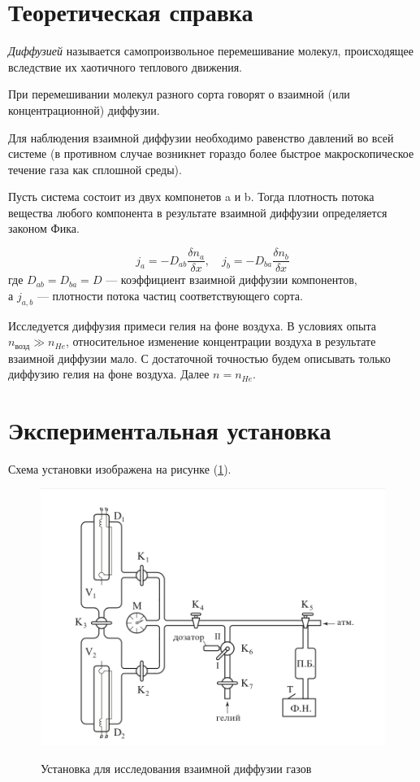 \documentclass[a4paper,12pt]{article} %
\begin{document}
\section*{Теоретическая справка}

\textit{Диффузией} называется самопроизвольное перемешивание молекул, происходящее вследствие их хаотичного теплового движения.

При перемешивании молекул разного сорта говорят о взаимной (или концентрационной) диффузии. 

Для наблюдения взаимной диффузии необходимо равенство давлений во всей системе (в противном случае возникнет гораздо более быстрое макроскопическое течение газа как сплошной среды).

\medskip

Пусть система состоит из двух компонетов a и b. 
Тогда плотность потока вещества любого компонента в результате взаимной диффузии определяется законом Фика. 

\begin{equation}
  j_a = - D_{ab} \frac{\delta n_a}{\delta x}, \quad j_b = - D_{ba} \frac{\delta n_b}{\delta x}
\end{equation}
где $D_{ab} = D_{ba} = D$ — коэффициент взаимной диффузии компонентов,\\ а $j_{a,b}$ — плотности потока частиц соответствующего сорта.

Исследуется диффузия примеси гелия на фоне воздуха. В условиях опыта $n_{\text{возд}} \gg n_{He}$, относительное изменение концентрации воздуха в результате взаимной диффузии мало. С достаточной точностью будем описывать только диффузию гелия на фоне воздуха. Далее $n = n_{He}$.

\section*{Экспериментальная установка}

Схема установки изображена на рисунке (\ref{fig:dr1}). 

\begin{figure}[h]
  \centering
  \includegraphics[scale = 0.75]{drawing1.png}
  \label{fig:dr1}
  \caption{Установка для исследования взаимной диффузии газов}
\end{figure}
\end{document}
